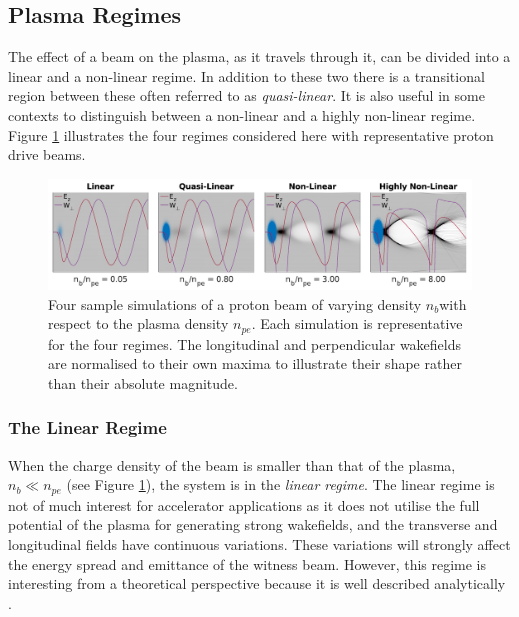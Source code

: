 \subsection{Plasma Regimes}
\label{Int:BPI:Reg}

The effect of a beam on the plasma, as it travels through it, can be divided into a linear and a non-linear regime. In addition to these two there is a transitional region between these often referred to as \textit{quasi-linear}. It is also useful in some contexts to distinguish between a non-linear and a highly non-linear regime. Figure \ref{Fig:BPI:Regime} illustrates the four regimes considered here with representative proton drive beams.

\begin{figure}[hbt]
    \centering
    \includegraphics[width=1.0\linewidth,trim={0mm 0mm 0mm 0mm},clip]{figures/Regimes}
    \caption{\label{Fig:BPI:Regime} Four sample simulations of a proton beam of varying density $n_{b} $with respect to the plasma density $n_{pe}$. Each simulation is representative for the four regimes. The longitudinal and perpendicular wakefields are normalised to their own maxima to illustrate their shape rather than their absolute magnitude.}
\end{figure}

\subsubsection{The Linear Regime}
\label{Int:BPI:Lin}

When the charge density of the beam is smaller than that of the plasma, $n_{b} \ll n_{pe}$ (see Figure \ref{Fig:BPI:Regime}), the system is in the \textit{linear regime}. The linear regime is not of much interest for accelerator applications as it does not utilise the full potential of the plasma for generating strong wakefields, and the transverse and longitudinal fields have continuous variations. These variations will strongly affect the energy spread and emittance of the witness beam. However, this regime is interesting from a theoretical perspective because it is well described analytically \cite{muggli:2017}.

